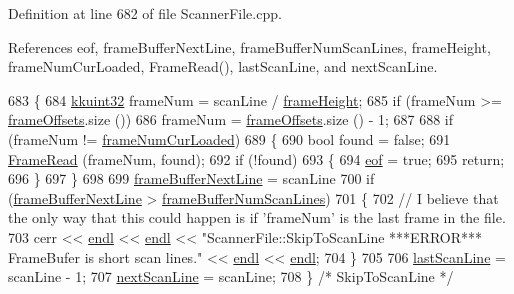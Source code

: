 Definition at line 682 of file Scanner\+File.\+cpp.



References eof, frame\+Buffer\+Next\+Line, frame\+Buffer\+Num\+Scan\+Lines, frame\+Height, frame\+Num\+Cur\+Loaded, Frame\+Read(), last\+Scan\+Line, and next\+Scan\+Line.


\begin{DoxyCode}
683 \{
684   \hyperlink{namespace_k_k_b_af8d832f05c54994a1cce25bd5743e19a}{kkuint32}  frameNum = scanLine / \hyperlink{class_k_k_l_s_c_1_1_scanner_file_a5598193d137fb79782cc1967ec830625}{frameHeight};
685   \textcolor{keywordflow}{if}  (frameNum >= \hyperlink{class_k_k_l_s_c_1_1_scanner_file_a61d36c66bb5f16ba82c088cd816b0c68}{frameOffsets}.size ())
686     frameNum = \hyperlink{class_k_k_l_s_c_1_1_scanner_file_a61d36c66bb5f16ba82c088cd816b0c68}{frameOffsets}.size () - 1;
687 
688   \textcolor{keywordflow}{if}  (frameNum != \hyperlink{class_k_k_l_s_c_1_1_scanner_file_a5af64c395493b5864d2c90f4de2677cf}{frameNumCurLoaded})
689   \{
690     \textcolor{keywordtype}{bool} found = \textcolor{keyword}{false};
691     \hyperlink{class_k_k_l_s_c_1_1_scanner_file_a0c815c55eae67de241d347018474891a}{FrameRead} (frameNum, found);
692     \textcolor{keywordflow}{if}  (!found)
693     \{
694       \hyperlink{class_k_k_l_s_c_1_1_scanner_file_aab1ab73f86c83384609406accceac88f}{eof} = \textcolor{keyword}{true};
695       \textcolor{keywordflow}{return};
696     \}
697   \}
698 
699   \hyperlink{class_k_k_l_s_c_1_1_scanner_file_a04ad19b685d3d4cd26ddc81a7e0f5d76}{frameBufferNextLine} = scanLine %
700   \textcolor{keywordflow}{if}  (\hyperlink{class_k_k_l_s_c_1_1_scanner_file_a04ad19b685d3d4cd26ddc81a7e0f5d76}{frameBufferNextLine} > \hyperlink{class_k_k_l_s_c_1_1_scanner_file_a23700be8017b18a9670d92938c72d74b}{frameBufferNumScanLines})
701   \{
702     \textcolor{comment}{// I believe that the only way that this could happen is if 'frameNum' is the last frame in the file.}
703     cerr << \hyperlink{namespace_k_k_b_ad1f50f65af6adc8fa9e6f62d007818a8}{endl} << \hyperlink{namespace_k_k_b_ad1f50f65af6adc8fa9e6f62d007818a8}{endl} << \textcolor{stringliteral}{"ScannerFile::SkipToScanLine   ***ERROR***   FrameBufer is short scan
       lines."} << \hyperlink{namespace_k_k_b_ad1f50f65af6adc8fa9e6f62d007818a8}{endl} << \hyperlink{namespace_k_k_b_ad1f50f65af6adc8fa9e6f62d007818a8}{endl};
704   \}
705 
706   \hyperlink{class_k_k_l_s_c_1_1_scanner_file_ae3275a2f28235ba289bf341cdc8373a6}{lastScanLine} = scanLine - 1;
707   \hyperlink{class_k_k_l_s_c_1_1_scanner_file_a8175e689d6539881903c75244ae1b73e}{nextScanLine} = scanLine;
708 \}  \textcolor{comment}{/* SkipToScanLine */}
\end{DoxyCode}
